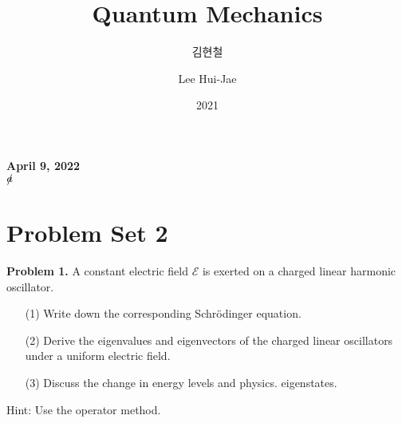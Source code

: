\documentclass[floatfix,nofootinbib,superscriptaddress,fleqn]{revtex4-2}
\begin{document}
\title{\Large Quantum Mechanics}
\author{김현철}
\author{Lee Hui-Jae}
\date{2021}

\maketitle

 \textbf{\color{red} April 9, 2022} \\ 
\vspace{2cm}
$\slashed{a}$
\section*{\large Problem Set 2}
\noindent \textbf{Problem 1.}
A constant electric field $\mathcal{E}$ is exerted on a charged linear
harmonic oscillator. 
\begin{itemize}
\item[(1)] Write down the corresponding Schr\"odinger equation. 
\item[(2)] Derive the eigenvalues and eigenvectors of the charged
  linear oscillators under a uniform electric field. 
\item[(3)] Discuss the change in energy levels and physics. 
  eigenstates. 
\end{itemize}
Hint: Use the operator method.
\end{document}
